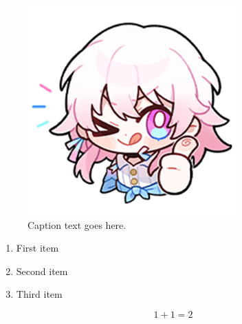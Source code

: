 \documentclass[12pt,a4paper]{article}
\begin{document}
		
	\newpage
	\begin{figure}[t]

	\centering\includegraphics{images/344652.png}
	
	\caption{\label{fig2}Caption text goes here.}
	
	\end{figure}


	\begin{enumerate}

	\item First item
	
	\item Second item
	
	\item Third item
	
	\end{enumerate}

	\begin {equation} 1+1=2
	\end {equation}


% 	
% 	
\end{document}

